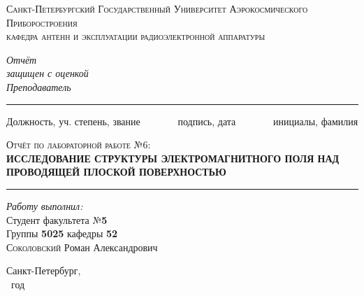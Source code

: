 \newcommand{\HRule}{\rule{\linewidth}{0.5mm}}
\begin{titlepage}
\begin{center}
\textsc{\large Санкт-Петербургский Государственный
Университет Аэрокосмического Приборостроения}\\[2cm]
\textsc{\large кафедра антенн и эксплуатации радиоэлектронной 
 аппаратуры}
\\[2cm]

 \begin{flushleft} \large
  \emph{Отчёт} \\
   \emph{защищен с оценкой}
   \\[0.5cm]
   \emph{Преподаватель}\\[-3mm]
   \HRule
\end{flushleft}
\begin{flushright}
\vspace{-6 pt}
{\small
Должность, уч. степень, звание
\ \ \ \ \ \ \
подпись, дата
\ \ \ \ \ \ \
инициалы, фамилия }\\[10mm]
\end{flushright}

\textsc{\Large Отчёт по лабораторной работе №6:} \\[1cm]
{\Large \bfseries ИССЛЕДОВАНИЕ СТРУКТУРЫ ЭЛЕКТРОМАГНИТНОГО ПОЛЯ
НАД ПРОВОДЯЩЕЙ ПЛОСКОЙ ПОВЕРХНОСТЬЮ}\\[1cm]

\HRule
\vspace{5 pt}
\begin{flushright}
    \begin{minipage}{0.5\textwidth}
        \begin{flushright} 
            \large
            \emph{Работу выполнил:}\\
            Студент факультета №\textbf{5}\\
            Группы \textbf{5025} кафедры \textbf{52}\\[2pt]
            \textsc{Соколовский} \textsc{Р}оман \textsc{А}лександрович
        \end{flushright}
    \end{minipage}
\end{flushright}

\vfill
Санкт-Петербург,\\
\the\year~год
\end{center}
\end{titlepage}

